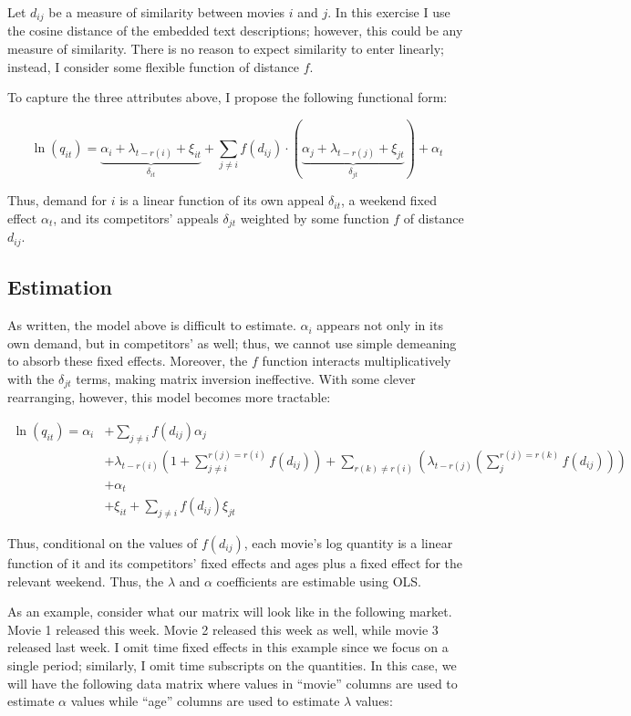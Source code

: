 \documentclass{article}
\begin{document}
Let $d_{ij}$ be a measure of similarity between movies $i$ and $j$. In this exercise I use the cosine distance of the embedded text descriptions; however, this could be any measure of similarity. There is no reason to expect similarity to enter linearly; instead, I consider some flexible function of distance $f$. 

To capture the three attributes above, I propose the following functional form:

$$\ln(q_{it}) = \underbrace{\alpha_i + \lambda_{t - r(i)} + \xi_{it}}_{\delta_{it}} + \sum_{j \neq i} f(d_{ij}) \cdot (\underbrace{\alpha_j + \lambda_{t - r(j)} + \xi_{jt}}_{\delta_{jt}}) + \alpha_t$$

Thus, demand for $i$ is a linear function of its own appeal $\delta_{it}$, a weekend fixed effect $\alpha_t$, and its competitors' appeals $\delta_{jt}$ weighted by some function $f$ of distance $d_{ij}$. 

\subsection{Estimation}

As written, the model above is difficult to estimate. $\alpha_i$ appears not only in its own demand, but in competitors' as well; thus, we cannot use simple demeaning to absorb these fixed effects. Moreover, the $f$ function interacts multiplicatively with the $\delta_{jt}$ terms, making matrix inversion ineffective. With some clever rearranging, however, this model becomes more tractable:

\begin{align*}
    \ln(q_{it}) = \alpha_i &+ \sum_{j \neq i} f(d_{ij}) \alpha_j \\
    &+ \lambda_{t - r(i)} \left(1 + \sum_{j \neq i}^{r(j) = r(i)} f(d_{ij})\right) + \sum_{r(k) \neq r(i)} \left(\lambda_{t - r(j)} \left(\sum_{j}^{r(j) = r(k)} f(d_{ij}) \right)\right) \\
    &+ \alpha_t \\
    &+ \xi_{it} + \sum_{j \neq i} f(d_{ij}) \xi_{jt}
\end{align*}

Thus, conditional on the values of $f(d_{ij})$, each movie's log quantity is a linear function of it and its competitors' fixed effects and ages plus a fixed effect for the relevant weekend. Thus, the $\lambda$ and $\alpha$ coefficients are estimable using OLS.

As an example, consider what our matrix will look like in the following market. Movie 1 released this week. Movie 2 released this week as well, while movie 3 released last week. I omit time fixed effects in this example since we focus on a single period; similarly, I omit time subscripts on the quantities. In this case, we will have the following data matrix where values in ``movie'' columns are used to estimate $\alpha$ values while ``age'' columns are used to estimate $\lambda$ values:
\end{document}
